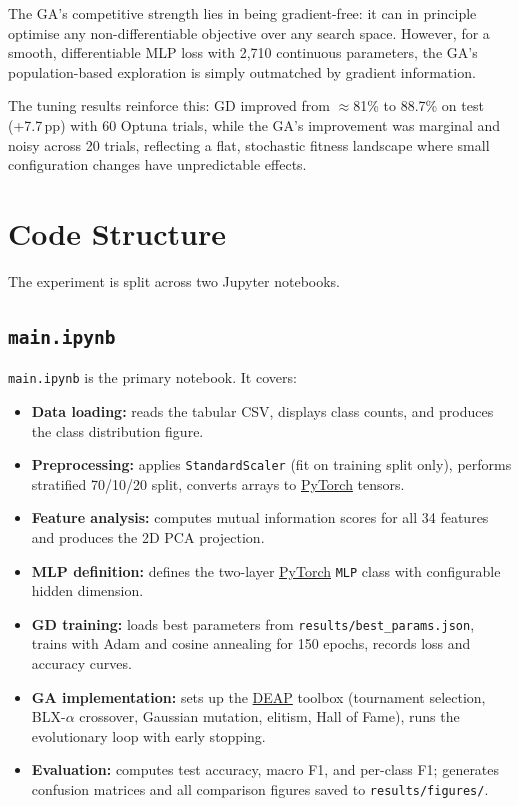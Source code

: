 \documentclass[11pt,a4paper]{article}
\begin{document}
The GA's competitive strength lies in being gradient-free: it can in principle optimise any
non-differentiable objective over any search space. However, for a smooth, differentiable MLP
loss with 2,710 continuous parameters, the GA's population-based exploration is simply outmatched
by gradient information.

The tuning results reinforce this: GD improved from $\approx$81\% to 88.7\% on test (+7.7\,pp)
with 60 Optuna trials, while the GA's improvement was marginal and noisy across 20 trials,
reflecting a flat, stochastic fitness landscape where small configuration changes have
unpredictable effects.

\appendix
\section{Code Structure}

The experiment is split across two Jupyter notebooks.

\subsection{\texttt{main.ipynb}}

\texttt{main.ipynb} is the primary notebook. It covers:
\begin{sloppypar}
\begin{itemize}
    \item \textbf{Data loading:} reads the tabular CSV, displays class counts, and produces the
          class distribution figure.
    \item \textbf{Preprocessing:} applies \texttt{StandardScaler} (fit on training split only),
          performs stratified 70/10/20 split, converts arrays to
          \href{https://pytorch.org}{PyTorch} tensors.
    \item \textbf{Feature analysis:} computes mutual information scores for all 34 features and
          produces the 2D PCA projection.
    \item \textbf{MLP definition:} defines the two-layer \href{https://pytorch.org}{PyTorch}
          \texttt{MLP} class with configurable hidden dimension.
    \item \textbf{GD training:} loads best parameters from \texttt{results/best\_params.json},
          trains with Adam and cosine annealing for 150 epochs, records loss and accuracy curves.
    \item \textbf{GA implementation:} sets up the \href{https://deap.readthedocs.io}{DEAP}
          toolbox (tournament selection, BLX-$\alpha$ crossover, Gaussian mutation, elitism, Hall
          of Fame), runs the evolutionary loop with early stopping.
    \item \textbf{Evaluation:} computes test accuracy, macro F1, and per-class F1; generates
          confusion matrices and all comparison figures saved to \texttt{results/figures/}.
\end{itemize}
\end{sloppypar}
\end{document}
